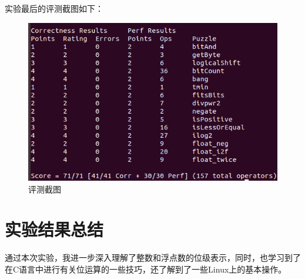 \documentclass{article}
\begin{document}
实验最后的评测截图如下：
\begin{figure}[h]
    \centering
    \includegraphics[width=15cm]{lab1.png}
    \caption{评测截图}
\end{figure}

\normalsize
\section{实验结果总结}
\large
通过本次实验，我进一步深入理解了整数和浮点数的位级表示，同时，也学习到了在C语言中进行有关位运算的一些技巧，还了解到了一些Linux上的基本操作。
\normalsize
\end{document}
